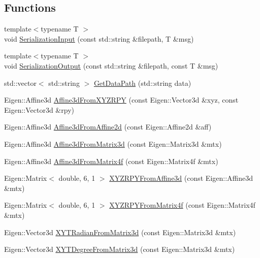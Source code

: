 \subsection*{Functions}
\begin{DoxyCompactItemize}
\item 
{\footnotesize template$<$typename T $>$ }\\void \hyperlink{namespacecommon_aaafeb67e7c22aa1324903d0c2539d310}{Serialization\+Input} (const std\+::string \&filepath, T \&msg)
\item 
{\footnotesize template$<$typename T $>$ }\\void \hyperlink{namespacecommon_ab793b440cdf411b716bde82330d2b364}{Serialization\+Output} (const std\+::string \&filepath, const T \&msg)
\item 
std\+::vector$<$ std\+::string $>$ \hyperlink{namespacecommon_a7301dc27a588fd37f62232a7c1a86149}{Get\+Data\+Path} (std\+::string data)
\item 
Eigen\+::\+Affine3d \hyperlink{namespacecommon_a8aeeb6f99d9f52e3f03d311bb7b724e8}{Affine3d\+From\+X\+Y\+Z\+R\+PY} (const Eigen\+::\+Vector3d \&xyz, const Eigen\+::\+Vector3d \&rpy)
\item 
Eigen\+::\+Affine3d \hyperlink{namespacecommon_ad4b5251bf0c4c9741c75b6bef6a23f30}{Affine3d\+From\+Affine2d} (const Eigen\+::\+Affine2d \&aff)
\item 
Eigen\+::\+Affine3d \hyperlink{namespacecommon_ae99f4d457d2bc28539862ba2698fc063}{Affine3d\+From\+Matrix3d} (const Eigen\+::\+Matrix3d \&mtx)
\item 
Eigen\+::\+Affine3d \hyperlink{namespacecommon_a52b746932856cc09f947c6e7b30c3a09}{Affine3d\+From\+Matrix4f} (const Eigen\+::\+Matrix4f \&mtx)
\item 
Eigen\+::\+Matrix$<$ double, 6, 1 $>$ \hyperlink{namespacecommon_abf63050ffc1423dd7c334a6c3c5618a1}{X\+Y\+Z\+R\+P\+Y\+From\+Affine3d} (const Eigen\+::\+Affine3d \&mtx)
\item 
Eigen\+::\+Matrix$<$ double, 6, 1 $>$ \hyperlink{namespacecommon_a75012054387d4de49be04481e844d4aa}{X\+Y\+Z\+R\+P\+Y\+From\+Matrix4f} (const Eigen\+::\+Matrix4f \&mtx)
\item 
Eigen\+::\+Vector3d \hyperlink{namespacecommon_a380c663a4f46d093dca7813385d5472c}{X\+Y\+T\+Radian\+From\+Matrix3d} (const Eigen\+::\+Matrix3d \&mtx)
\item 
Eigen\+::\+Vector3d \hyperlink{namespacecommon_ac2334937b8f4c3b74ba6393a30876499}{X\+Y\+T\+Degree\+From\+Matrix3d} (const Eigen\+::\+Matrix3d \&mtx)
\item 

\end{DoxyCompactItemize}
